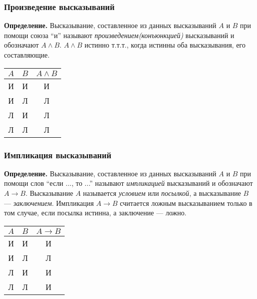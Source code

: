 \documentclass{article}
\begin{document}
    \subsubsection{Произведение высказываний}

    \textbf{Определение.} Высказывание, составленное из данных высказываний \(A\) и \(B\) при помощи союза ``и'' называют \textit{произведением(конъюнкцией)} высказываний и обозначают \(A \wedge B\). \(A \wedge B\) истинно т.т.т., когда истинны оба высказывания, его составляющие.

    \begin{center}
        \begin{tabular}{||c | c | c||}
            \hline
            \(A\) &  \(B\) & \(A \wedge B\)\\
            \hline \hline
            И & И & И\\
            \hline
            И & Л & Л\\
            \hline
            Л & И & Л\\
            \hline
            Л & Л & Л\\
            \hline
        \end{tabular}
    \end{center}

    \subsubsection{Импликация высказываний}

    \textbf{Определение.} Высказывание, составленное из данных высказываний \(A\) и \(B\) при помощи слов ``если ..., то ...'' называют \textit{импликацией} высказываний и обозначают \(A \rightarrow B\). Высказывание \(A\) называется \textit{условием} или \textit{посылкой}, а высказывание \(B\) --- \textit{заключением}. Импликация \(A \rightarrow B\) считается ложным высказыванием только в том случае, если посылка истинна, а заключение --- ложно.

    \begin{center}
        \begin{tabular}{||c | c | c||}
            \hline
            \(A\) &  \(B\) & \(A \rightarrow B\)\\
            \hline \hline
            И & И & И\\
            \hline
            И & Л & Л\\
            \hline
            Л & И & И\\
            \hline
            Л & Л & И\\
            \hline
        \end{tabular}
    \end{center}
\end{document}

